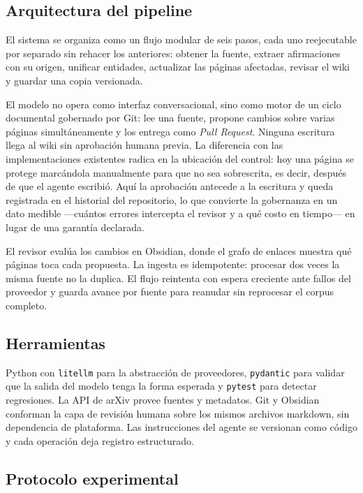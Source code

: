 \documentclass[11pt,letterpaper]{article}
\begin{document}
\subsection{Arquitectura del pipeline}

El sistema se organiza como un flujo modular de seis pasos, cada uno reejecutable por separado sin
rehacer los anteriores: obtener la fuente, extraer afirmaciones con su origen, unificar entidades,
actualizar las páginas afectadas, revisar el wiki y guardar una copia versionada.

El modelo no opera como interfaz conversacional, sino como motor de un ciclo documental gobernado por
Git: lee una fuente, propone cambios sobre varias páginas simultáneamente y los entrega como
\textit{Pull Request}. Ninguna escritura llega al wiki sin aprobación humana previa. La diferencia con
las implementaciones existentes radica en la ubicación del control: hoy una página se protege
marcándola manualmente para que no sea sobrescrita, es decir, después de que el agente escribió. Aquí
la aprobación antecede a la escritura y queda registrada en el historial del repositorio, lo que
convierte la gobernanza en un dato medible —cuántos errores intercepta el revisor y a qué costo en
tiempo— en lugar de una garantía declarada.

El revisor evalúa los cambios en Obsidian, donde el grafo de enlaces muestra qué páginas toca cada
propuesta. La ingesta es idempotente: procesar dos veces la misma fuente no la duplica. El flujo
reintenta con espera creciente ante fallos del proveedor y guarda avance por fuente para reanudar sin
reprocesar el corpus completo.

\subsection{Herramientas}

Python con \texttt{litellm} para la abstracción de proveedores, \texttt{pydantic} para validar que la
salida del modelo tenga la forma esperada y \texttt{pytest} para detectar regresiones. La API de arXiv
provee fuentes y metadatos. Git y Obsidian conforman la capa de revisión humana sobre los mismos
archivos markdown, sin dependencia de plataforma. Las instrucciones del agente se versionan como
código y cada operación deja registro estructurado.

\subsection{Protocolo experimental}
\end{document}
